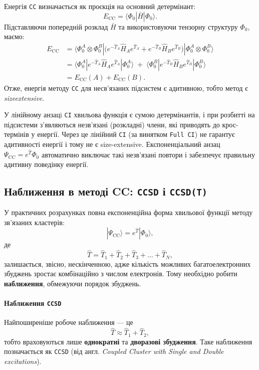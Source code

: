 Енергія \texttt{CC} визначається як проєкція на основний детермінант:
\[
E_{\text{CC}} = \langle \Phi_0 | \bar{H} | \Phi_0 \rangle.
\]
Підставляючи попередній розклад \(\bar{H}\) та використовуючи тензорну структуру \(\Phi_0\), маємо:
\[
\begin{aligned}
E_{\text{CC}}
&= \langle \Phi_0^A\otimes\Phi_0^B |
\bigl(e^{-\hat{T}_A}\hat{H}_A e^{\hat{T}_A} + e^{-\hat{T}_B}\hat{H}_B e^{\hat{T}_B}\bigr)
| \Phi_0^A\otimes\Phi_0^B \rangle \\
&= \langle \Phi_0^A | e^{-\hat{T}_A}\hat{H}_A e^{\hat{T}_A} | \Phi_0^A \rangle
\;+\;
\langle \Phi_0^B | e^{-\hat{T}_B}\hat{H}_B e^{\hat{T}_B} | \Phi_0^B \rangle \\
&= E_{\text{CC}}(A) + E_{\text{CC}}(B).
\end{aligned}
\]
Отже, енергія методу \texttt{CC} для несв'язаних підсистем є адитивною,
тобто метод є \emph{size\-extensive}.

\bigskip

\begin{commentbox}
У лінійному анзацi \texttt{CI} хвильова функція є сумою детермінантів,
і при розбитті на підсистеми з'являються незв'язані (розкладні) члени,
які приводять до крос-термінів у енергії. Через це лінійний \texttt{CI}
(за винятком \texttt{Full CI}) не гарантує адитивності енергії і тому не є
size-extensive. Експоненціальний анзац \(\Psi_{\text{CC}}=e^{\hat{T}}\Phi_0\)
автоматично виключає такі незв'язані повтори і забезпечує правильну
адитивну поведінку енергії.
\end{commentbox}

\subsection{Наближення в методі CC: \texttt{CCSD} і \texttt{CCSD(T)}}

У практичних розрахунках повна експоненційна форма хвильової функції методу
зв'язаних кластерів:
\[
|\Psi_{\text{CC}}\rangle = e^{\hat{T}} |\Phi_0\rangle,
\]
де
\[
\hat{T} = \hat{T}_1 + \hat{T}_2 + \hat{T}_3 + \dots + \hat{T}_N,
\]
залишається, звісно, нескінченною, адже кількість можливих багатоелектронних
збуджень зростає комбінаційно з числом електронів.
Тому необхідно робити \textbf{наближення}, обмежуючи порядок збуджень.

\paragraph{Наближення \texttt{CCSD}}
Найпоширеніше робоче наближення — це
\[
\hat{T} \approx \hat{T}_1 + \hat{T}_2,
\]
тобто враховуються лише \textbf{однократні} та \textbf{дворазові збудження}.
Таке наближення позначається як \texttt{CCSD}
(від англ. \emph{Coupled Cluster with Single and Double excitations}).

